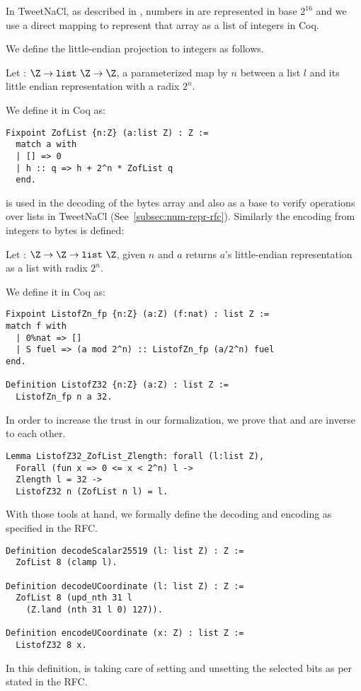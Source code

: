 In TweetNaCl, as described in , numbers in
 are represented in base $2^{16}$ and we use a direct mapping to
represent that array as a list of integers in Coq.

We define the little-endian projection to integers as follows.
\begin{dfn}
Let  : $\Z \rightarrow \texttt{list}~\Z \rightarrow \Z$,
a parameterized map by $n$ between a list $l$ and its little endian representation
with a radix $2^n$.
\end{dfn}
We define it in Coq as:
\begin{lstlisting}[language=Coq]
Fixpoint ZofList {n:Z} (a:list Z) : Z :=
  match a with
  | [] => 0
  | h :: q => h + 2^n * ZofList q
  end.
\end{lstlisting}

 is used in the decoding of the bytes array and also as a
base to verify operations over lists in TweetNaCl (See~\ref{subsec:num-repr-rfc}).
Similarly the encoding from integers to bytes is defined:
\begin{dfn}
Let  : $\Z \rightarrow \Z \rightarrow \texttt{list}~\Z$, given
$n$ and $a$ returns $a$'s little-endian representation
as a list with radix $2^n$.
\end{dfn}
We define it in Coq as:
\begin{lstlisting}[language=Coq]
Fixpoint ListofZn_fp {n:Z} (a:Z) (f:nat) : list Z :=
match f with
  | 0%nat => []
  | S fuel => (a mod 2^n) :: ListofZn_fp (a/2^n) fuel
end.

Definition ListofZ32 {n:Z} (a:Z) : list Z :=
  ListofZn_fp n a 32.
\end{lstlisting}
In order to increase the trust in our formalization, we prove that
 and  are inverse to each other.

\begin{lstlisting}[language=Coq]
Lemma ListofZ32_ZofList_Zlength: forall (l:list Z),
  Forall (fun x => 0 <= x < 2^n) l ->
  Zlength l = 32 ->
  ListofZ32 n (ZofList n l) = l.
\end{lstlisting}

With those tools at hand, we formally define the decoding and encoding as
specified in the RFC.

\begin{lstlisting}[language=Coq]
Definition decodeScalar25519 (l: list Z) : Z :=
  ZofList 8 (clamp l).

Definition decodeUCoordinate (l: list Z) : Z :=
  ZofList 8 (upd_nth 31 l
    (Z.land (nth 31 l 0) 127)).

Definition encodeUCoordinate (x: Z) : list Z :=
  ListofZ32 8 x.
\end{lstlisting}

In this definition,  is taking care of setting and unsetting the
selected bits as per stated in the RFC.
